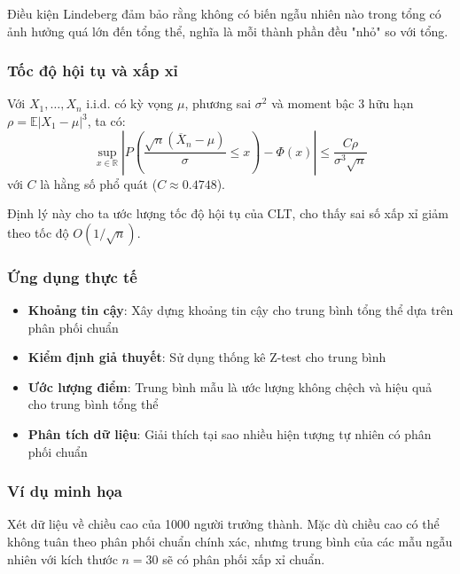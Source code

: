\begin{tinhchat}
Điều kiện Lindeberg đảm bảo rằng không có biến ngẫu nhiên nào trong tổng có ảnh hưởng quá lớn đến tổng thể, nghĩa là mỗi thành phần đều "nhỏ" so với tổng.
\end{tinhchat}

\subsubsection*{Tốc độ hội tụ và xấp xỉ}
\begin{dl}
Với $X_1,\ldots,X_n$ i.i.d. có kỳ vọng $\mu$, phương sai $\sigma^2$ và moment bậc 3 hữu hạn $\rho=\mathbb{E}|X_1-\mu|^3$, ta có:
\[
\sup_{x\in\mathbb{R}}\left|P\left(\frac{\sqrt{n}(\overline{X}_n-\mu)}{\sigma}\leq x\right)-\Phi(x)\right|\leq\frac{C\rho}{\sigma^3\sqrt{n}}
\]
với $C$ là hằng số phổ quát ($C\approx 0.4748$).
\end{dl}

\begin{tinhchat}
Định lý này cho ta ước lượng tốc độ hội tụ của CLT, cho thấy sai số xấp xỉ giảm theo tốc độ $O(1/\sqrt{n})$.
\end{tinhchat}

\subsubsection*{Ứng dụng thực tế}
\begin{itemize}
    \item \textbf{Khoảng tin cậy}: Xây dựng khoảng tin cậy cho trung bình tổng thể dựa trên phân phối chuẩn
    \item \textbf{Kiểm định giả thuyết}: Sử dụng thống kê Z-test cho trung bình
    \item \textbf{Ước lượng điểm}: Trung bình mẫu là ước lượng không chệch và hiệu quả cho trung bình tổng thể
    \item \textbf{Phân tích dữ liệu}: Giải thích tại sao nhiều hiện tượng tự nhiên có phân phối chuẩn
\end{itemize}

\subsubsection*{Ví dụ minh họa}
Xét dữ liệu về chiều cao của 1000 người trưởng thành. Mặc dù chiều cao có thể không tuân theo phân phối chuẩn chính xác, nhưng trung bình của các mẫu ngẫu nhiên với kích thước $n=30$ sẽ có phân phối xấp xỉ chuẩn.

